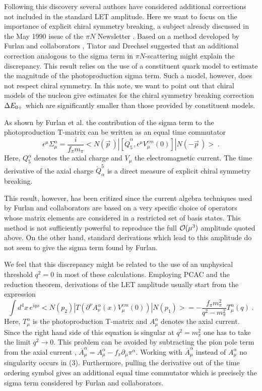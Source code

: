 Following this discovery several authors have considered additional
corrections not included in the standard LET amplitude. 
Here we want to focus on the importance of explicit 
chiral symmetry breaking, a subject already discussed in the May 
1990 issue of the $\pi N$ Newsletter \cite{TD}.  Based on a method 
developed  by Furlan  and collaborators  \cite{FPV},  Tiator  and 
Drechsel suggested that an additional correction analogous to the 
sigma  term in $\pi N$-scattering  might explain  the discrepancy. 
This result  relies  on the use of a constituent  quark  model to 
estimate the magnitude of the photoproduction sigma term.  Such a 
model, however, does not respect chiral symmetry. In this note, we 
want  to  point  out  that  chiral  models  of the  nucleon  give 
estimates for the chiral symmetry breaking correction $\Delta E_{0+}$ which 
are significantly  smaller  than  those  provided  by constituent 
models.

As shown  by Furlan  et al.  \cite{FPV}  the contribution  of the 
sigma term to the photoproduction  T-matrix  can be written as an 
equal time commutator
\begin{equation} \label{Sig} \epsilon^\mu\Sigma_{\mu}^\alpha = 
\frac{i}{f_\pi m_\pi} <N(\vec{p}\,)| [\dot{Q}_5^{\alpha},
\epsilon^\mu  V_{\mu}^{em}(0)]|N(-\vec{p}\,)> \; . 
\end{equation} 
Here, $Q_5^\alpha$  denotes the axial charge  and $V_\mu$  the
electromagnetic  current. The time derivative of the axial charge
 $\dot{Q}^5_\alpha$  is a direct measure of explicit chiral
 symmetry breaking.
 
This result, however, has been critized \cite{Dre,Kam} since the 
current algebra techniques used by Furlan and collaborators are
based on a very specific choice of operators whose matrix elements 
are considered in a restricted set of basis states. This method
is not sufficiently powerful to reproduce the full ${\cal O}
(\mu^3)$ amplitude quoted above. On the other hand, standard 
derivations which lead to this amplitude do not seem to give the
sigma term found by Furlan.

We feel that this discrepancy might be related to the use of an 
unphysical threshold  $q^2=0$ in most of these calculations.
Employing PCAC and the reduction theorem, derivations of the LET
amplitude usually start from  the expression
\begin{equation}
\int d^4x\, e^{iqx} <N(p_2)|T(\partial^\nu A_\nu^\alpha (x)
V_\mu^{em} (0))|N(p_1)> = -\frac{f_\pi m_\pi^2}{q^2-m_\pi^2}
T_\mu^\alpha (q)\; .
\end{equation}
Here, $T_\mu^\alpha$ is the photoproduction T-matrix and $A_\mu^\alpha$
denotes the axial current. Since the right hand side of this equation
is singular
at $q^2=m_\pi^2$ one has to take the limit $q^2 \to 0$. This problem
can be avoided by subtracting the pion pole term from the axial current
\cite{BPP}, $\overline{A}_\mu^\alpha=A_\mu^\alpha-f_\pi \partial_\mu
 \pi^\alpha$. Working with $\overline{A}_\mu^\alpha$ instead of 
 $A_\mu^\alpha$ no singularity occurs in (3). Furthermore, pulling
 the derivative out of the time ordering symbol gives an additional equal
 time commutator which is precisely the sigma term considered
 by Furlan and collaborators.
 

